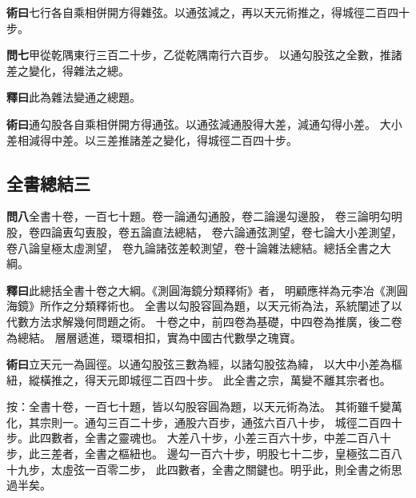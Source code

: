 \documentclass[12pt,a4paper]{article}
\newcommand{\Section}[1]{\subsection*{#1}}
\begin{document}
\noindent\textbf{術曰}\quad 七行各自乘相併開方得雜弦。以通弦減之，再以天元術推之，得城徑二百四十步。

\vspace{0.5em}

\noindent\textbf{問七}\quad 甲從乾隅東行三百二十步，乙從乾隅南行六百步。
以通勾股弦之全數，推諸差之變化，得雜法之總。

\vspace{0.3em}

\noindent\textbf{釋曰}\quad 此為雜法變通之總題。

\vspace{0.3em}

\noindent\textbf{術曰}\quad 通勾股各自乘相併開方得通弦。以通弦減通股得大差，減通勾得小差。
大小差相減得中差。以三差推諸差之變化，得城徑二百四十步。

\Section{全書總結三}

\noindent\textbf{問八}\quad 全書十卷，一百七十題。卷一論通勾通股，卷二論邊勾邊股，
卷三論明勾明股，卷四論叀勾叀股，卷五論直法總結，
卷六論通弦測望，卷七論大小差測望，卷八論皇極太虛測望，
卷九論諸弦差較測望，卷十論雜法總結。總括全書之大綱。

\vspace{0.3em}

\noindent\textbf{釋曰}\quad 此總括全書十卷之大綱。《測圓海鏡分類釋術》者，
明顧應祥為元李冶《測圓海鏡》所作之分類釋術也。
全書以勾股容圓為題，以天元術為法，系統闡述了以代數方法求解幾何問題之術。
十卷之中，前四卷為基礎，中四卷為推廣，後二卷為總結。
層層遞進，環環相扣，實為中國古代數學之瑰寶。

\vspace{0.3em}

\noindent\textbf{術曰}\quad 立天元一為圓徑。以通勾股弦三數為經，以諸勾股弦為緯，
以大中小差為樞紐，縱橫推之，得天元即城徑二百四十步。
此全書之宗，萬變不離其宗者也。

\vspace{0.3em}

\noindent
按：全書十卷，一百七十題，皆以勾股容圓為題，以天元術為法。
其術雖千變萬化，其宗則一。通勾三百二十步，通股六百步，通弦六百八十步，
城徑二百四十步。此四數者，全書之靈魂也。
大差八十步，小差三百六十步，中差二百八十步，此三差者，全書之樞紐也。
邊勾一百六十步，明股七十二步，皇極弦二百八十九步，太虛弦一百零二步，
此四數者，全書之關鍵也。明乎此，則全書之術思過半矣。

\vspace{0.5em}
\end{document}

